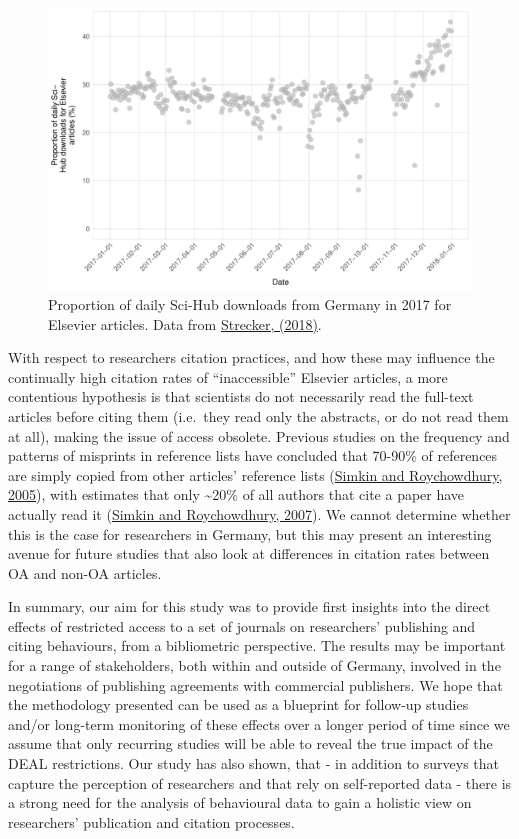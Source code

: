 \documentclass[
]{article}
\begin{document}
\begin{figure}

{\centering \includegraphics[width=0.75\linewidth]{analysis_files/figure-latex/scihub-germany-1} 

}

\caption{Proportion of daily Sci-Hub downloads from Germany in 2017 for Elsevier articles. Data from \href{http://doi.org/10.5281/zenodo.1286284}{Strecker, (2018)}.}\label{fig:scihub-germany}
\end{figure}

With respect to researchers citation practices, and how these may influence the continually high citation rates of ``inaccessible'' Elsevier articles, a more contentious hypothesis is that scientists do not necessarily read the full-text articles before citing them (i.e.~they read only the abstracts, or do not read them at all), making the issue of access obsolete. Previous studies on the frequency and patterns of misprints in reference lists have concluded that 70-90\% of references are simply copied from other articles' reference lists (\href{https://doi.org/10.1007/s11192-005-0028-2}{Simkin and Roychowdhury, 2005}), with estimates that only \textasciitilde20\% of all authors that cite a paper have actually read it (\href{https://doi.org/10.1002/asi.20653}{Simkin and Roychowdhury, 2007}). We cannot determine whether this is the case for researchers in Germany, but this may present an interesting avenue for future studies that also look at differences in citation rates between OA and non-OA articles.

In summary, our aim for this study was to provide first insights into the direct effects of restricted access to a set of journals on researchers' publishing and citing behaviours, from a bibliometric perspective. The results may be important for a range of stakeholders, both within and outside of Germany, involved in the negotiations of publishing agreements with commercial publishers. We hope that the methodology presented can be used as a blueprint for follow-up studies and/or long-term monitoring of these effects over a longer period of time since we assume that only recurring studies will be able to reveal the true impact of the DEAL restrictions. Our study has also shown, that - in addition to surveys that capture the perception of researchers and that rely on self-reported data - there is a strong need for the analysis of behavioural data to gain a holistic view on researchers' publication and citation processes.
\end{document}
